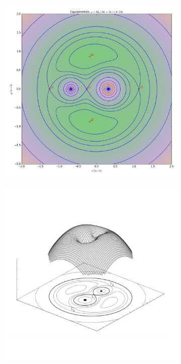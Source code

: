 \documentclass[../../main/thesis_msc.tex]{subfiles}
\begin{document}
				\begin{figure}[h]
   					\centering
    				\begin{subfigure}[h]{0.45\textwidth}
        				\centering
       					 \includegraphics[width=\linewidth]{../figures/chapter1/equipotential_surfaces/equipotentials_mu_0_316.png} 
    				\end{subfigure}
    				\hspace{0.1cm}
    				\begin{subfigure}[h]{0.45\textwidth}
        				\centering
        				\includegraphics[scale = 1.05]{../figures/chapter1/3Dequipotentials.png} 

\end{subfigure}
\end{figure}
\end{document}
